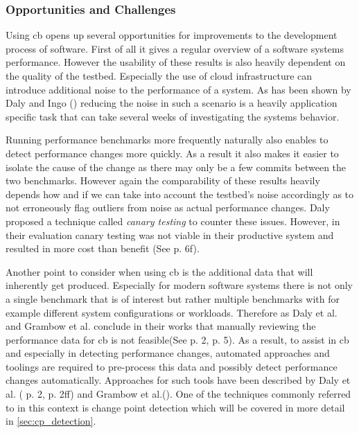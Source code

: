 \documentclass[	runningheads,
				a4paper]{llncs}
\begin{document}
		\subsubsection{Opportunities and Challenges}
		\label{sssec:cd_challenges}

		Using \gls{cb} opens up several opportunities for improvements to the development process of software. First of all it gives a regular overview of a software systems performance. However the usability of these results is also heavily dependent on the quality of the testbed. Especially the use of cloud infrastructure can introduce additional noise to the performance of a system. As has been shown by Daly and Ingo (\cite{daly2019}) reducing the noise in such a scenario is a heavily application specific task that can take several weeks of investigating the systems behavior.

	Running performance benchmarks more frequently naturally also enables to detect performance changes more quickly. As a result it also makes it easier to isolate the cause of the change as there may only be a few commits between the two benchmarks. However again the comparability of these results heavily depends how and if we can take into account the testbed's noise accordingly as to not erroneously flag outliers from noise as actual performance changes. Daly proposed a technique called \textit{canary testing} to counter these issues. However, in their evaluation canary testing was not viable in their productive system and resulted in more cost than benefit (See \cite{daly2021} p. 6f).

	Another point to consider when using \gls{cb} is the additional data that will inherently get produced. Especially for modern software systems there is not only a single benchmark that is of interest but rather multiple benchmarks with for example different system configurations or workloads. Therefore as Daly et al. and Grambow et al. conclude in their works that manually reviewing the performance data for \gls{cb} is not feasible(See \cite{daly2020} p. 2, \cite{grambow2019} p. 5). As a result, to assist in \gls{cb} and especially in detecting performance changes, automated approaches and toolings are required to pre-process this data and possibly detect performance changes automatically. Approaches for such tools have been described by Daly et al. (\cite{daly2020} p. 2, \cite{daly2021} p. 2ff) and Grambow et al.(\cite{grambow2019}). One of the techniques commonly referred to in this context is change point detection which will be covered in more detail in \autoref{sec:cp_detection}.
\end{document}
